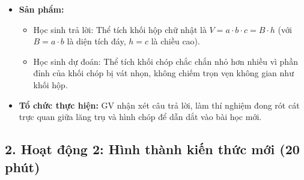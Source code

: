 \documentclass[12pt, a4paper]{article}
\begin{document}
\begin{itemize}[leftmargin=1.2cm]
    \item[c)] \textbf{Sản phẩm:}
    \begin{itemize}[leftmargin=0.6cm]
        \item Học sinh trả lời: Thể tích khối hộp chữ nhật là $V = a \cdot b \cdot c = B \cdot h$ (với $B = a \cdot b$ là diện tích đáy, $h = c$ là chiều cao).
        \item Học sinh dự đoán: Thể tích khối chóp chắc chắn nhỏ hơn nhiều vì phần đỉnh của khối chóp bị vát nhọn, không chiếm trọn vẹn không gian như khối hộp.
    \end{itemize}

    \item[d)] \textbf{Tổ chức thực hiện:} GV nhận xét câu trả lời, làm thí nghiệm đong rót cát trực quan giữa lăng trụ và hình chóp để dẫn dắt vào bài học mới.
\end{itemize}

\subsection*{2. Hoạt động 2: Hình thành kiến thức mới (20 phút)}
\end{document}
